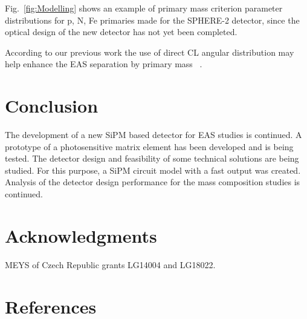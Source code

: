 \documentclass[a4paper]{jpconf}
\begin{document}
Fig.~\ref{fig:Modelling} shows an example of primary mass criterion parameter distributions for p, N, Fe primaries made for the SPHERE-2 detector, since the optical design of the new detector has not yet been completed.

According to our previous work the use of direct CL angular distribution may help enhance the EAS separation by primary mass ~\cite{Gal18a}.

\section{Conclusion}
The development of a new SiPM based detector for EAS studies is continued. A prototype of a photosensitive matrix element has been developed and is being tested. The detector design and feasibility of some technical solutions are being studied.  For this purpose, a SiPM circuit model with a fast output was created. Analysis of the detector design performance for the mass composition studies is continued.

\section{Acknowledgments}
MEYS of Czech Republic grants LG14004 and LG18022.

\section*{References}

\end{document}
